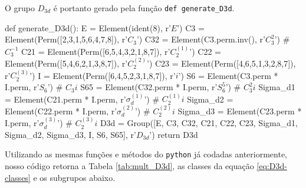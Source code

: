 \documentclass[a4paper,10pt]{article}
\newcommand{\python}[1]{\texttt{#1}}
\begin{document}
O grupo $D_{3d}$ é portanto gerado pela função \python{def generate_D3d}.
\begin{Python}
def generate_D3d():
    E = Element(ident(8), r'$E$')
    C3 = Element(Perm([2,3,1,5,6,4,7,8]), r'$C_3$')
    C32 = Element(C3.perm.inv(), r'$C_3^2$')                    # $C_3^{-1}$
    C21 = Element(Perm([6,5,4,3,2,1,8,7]), r'$C_2^{(1)}$')
    C22 = Element(Perm([5,4,6,2,1,3,8,7]), r'$C_2^{(2)}$')
    C23 = Element(Perm([4,6,5,1,3,2,8,7]), r'$C_2^{(3)}$')
    I = Element(Perm([6,4,5,2,3,1,8,7]), r'$i$')
    S6 = Element(C3.perm * I.perm, r'$S_6$')                    # $C_3 i$
    S65 = Element(C32.perm * I.perm, r'$S_6^5$')                # $C_3^2 i$
    Sigma_d1 = Element(C21.perm * I.perm, r'$\sigma_d^{(1)}$')  # $C_2^{(1)} i$
    Sigma_d2 = Element(C22.perm * I.perm, r'$\sigma_d^{(2)}$')  # $C_2^{(2)} i$
    Sigma_d3 = Element(C23.perm * I.perm, r'$\sigma_d^{(3)}$')  # $C_2^{(3)} i$
    D3d = Group([E, C3, C32, C21, C22, C23,
                 Sigma_d1, Sigma_d2, Sigma_d3, I, S6, S65], r'$D_{3d}$')
    return D3d
\end{Python}

Utilizando as mesmas funções e métodos do \python{python} já codadas anteriormente, nosso código retorna a Tabela \ref{tab:mult_D3d}, as classes da equação \ref{eq:D3d-classes} e os subgrupos abaixo.
\end{document}
